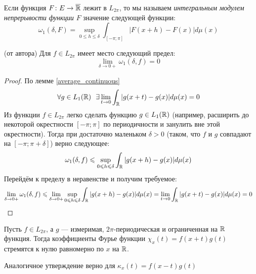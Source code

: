 \begin{definition}
	Если функция $F \colon E \to \overline{\mathbb{R}}$ лежит в $L_{2\pi}$, то мы называем \textit{интегральным модулем непрерывости функции $F$} значение следующей функции:
	\[
		\omega_1(\delta, F) = \sup_{0 \le h \le \delta} \int_{[-\pi; \pi]} |F(x + h) - F(x)|d\mu(x)
	\]
\end{definition}

\begin{lemma} (от автора)
	Для $f \in L_{2\pi}$ имеет место следующий предел:
	\[
		\lim_{\delta \to 0+} \omega_1(\delta, f) = 0
	\]
\end{lemma}

\begin{proof}
	По лемме \ref{average_continuous}
	\[
		\forall g \in L_1(\mathbb{R})\ \ \exists \lim_{t \to 0} \int_{\mathbb{R}} |g(x + t) - g(x)|d\mu(x) = 0
	\]
	Из функции $f \in L_{2\pi}$ легко сделать функцию $g \in L_1(\mathbb{R})$ (например, расширить до некоторой окрестности $[-\pi; \pi]$ по периодичности и занулить вне этой окрестности). Тогда при достаточно маленьком $\delta > 0$ (таком, что $f$ и $g$ совпадают на $[-\pi; \pi + \delta]$) верно следующее:
	\[
		\omega_1(\delta, f) \leqslant \sup_{0 \leqslant h \leqslant \delta} \int_{\mathbb{R}} |g(x + h) - g(x)|d\mu(x)
	\]
	Перейдём к пределу в неравенстве и получим требуемое:
	\[
		\lim_{\delta \to 0+} \omega_1(\delta, f) \leqslant \lim_{\delta \to 0+} \sup_{0 \leqslant h \leqslant \delta} \int_{\mathbb{R}} |g(x + h) - g(x)|d\mu(x) = \lim_{t \to 0} \int_{\mathbb{R}} |g(x + t) - g(x)|d\mu(x) = 0
	\]
\end{proof}

\begin{lemma} \label{uniconv_lemma}
	Пусть $f \in L_{2\pi}$, а $g$ --- измеримая, $2\pi$-периодическая и ограниченная на $\mathbb{R}$ функция. Тогда коэффициенты Фурье функции $\chi_x(t) = f(x + t)g(t)$ стремятся к нулю равномерно по $x$ на $\mathbb{R}$.
\end{lemma}

\begin{note}
	Аналогичное утверждение верно для $\kappa_x(t) = f(x - t)g(t)$
\end{note}

